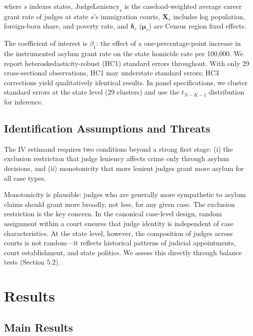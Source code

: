 \documentclass[12pt]{article}
\begin{document}
\noindent where $s$ indexes states, $\text{JudgeLeniency}_s$ is the caseload-weighted average career grant rate of judges at state $s$'s immigration courts, $\mathbf{X}_s$ includes log population, foreign-born share, and poverty rate, and $\boldsymbol{\delta}_r$ ($\boldsymbol{\mu}_r$) are Census region fixed effects.

The coefficient of interest is $\beta_1$: the effect of a one-percentage-point increase in the instrumented asylum grant rate on the state homicide rate per 100,000. We report heteroskedasticity-robust (HC1) standard errors throughout. With only 29 cross-sectional observations, HC1 may understate standard errors; HC3 corrections yield qualitatively identical results. In panel specifications, we cluster standard errors at the state level (29 clusters) and use the $t_{N-K-1}$ distribution for inference.

\subsection{Identification Assumptions and Threats}

The IV estimand requires two conditions beyond a strong first stage: (i) the exclusion restriction that judge leniency affects crime only through asylum decisions, and (ii) monotonicity that more lenient judges grant more asylum for all case types.

Monotonicity is plausible: judges who are generally more sympathetic to asylum claims should grant more broadly, not less, for any given case. The exclusion restriction is the key concern. In the canonical case-level design, random assignment within a court ensures that judge identity is independent of case characteristics. At the state level, however, the composition of judges across courts is not random---it reflects historical patterns of judicial appointments, court establishment, and state politics. We assess this directly through balance tests (Section 5.2).


\section{Results}

\subsection{Main Results}


\end{document}
